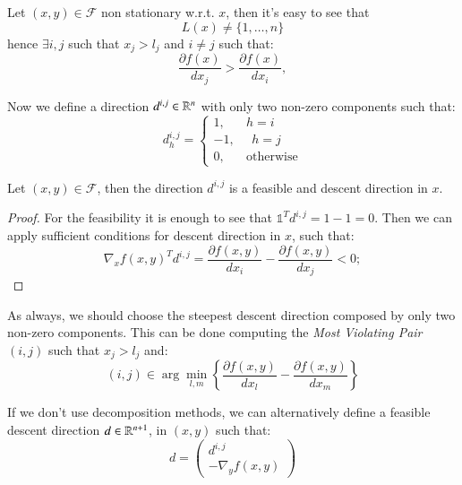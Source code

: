 Let $(x,y) \in \mathcal{F}$ non stationary w.r.t. $x$, then it's easy to see that
\begin{equation}
 L(x)\ne \{1,\ldots,n\}
\end{equation}
hence $\exists i,j$ such that $x_j>l_j$ and $i \ne j$ such that:
\begin{equation}
 \frac{\partial f(x)}{dx_j} > \frac{\partial f(x)}{dx_i}, 
\end{equation}

Now we define a direction $d^{i,j} \in \mathbb{R}^n$ with only two non-zero components such that:
\begin{equation}\label{eq:direction}
d_h^{i,j}= 
\begin{cases}
1, \quad \text{    } h=i\\
-1, \text{    } \text{    } h=j\\
0, \quad \text{    } \text{otherwise}
\end{cases}
\end{equation}

\begin{proposition}
Let $(x,y) \in \mathcal{F}$, then the direction $d^{i,j}$ is a feasible and descent direction in $x$.
\end{proposition}
\begin{proof}
For the feasibility it is enough to see that $\mathds{1}^Td^{i,j}=1-1=0$.
Then we can apply sufficient conditions for descent direction in $x$, such that:
\begin{equation*}
 \nabla_xf(x,y)^Td^{i,j} =  \frac{\partial f(x,y)}{dx_i} - \frac{\partial f(x,y)}{dx_j}<0; 
\end{equation*}
\end{proof}

As always, we should choose the steepest descent direction composed by only two non-zero components.
This can be done computing the \emph{Most Violating Pair} $(i,j)$ such that $x_j>l_j$ and:
\begin{equation}
 (i,j) \in \arg \min_{l,m} \left\{\frac{\partial f(x,y)}{dx_l} - \frac{\partial f(x,y)}{dx_m}  \right\}
\end{equation}

If we don't use decomposition methods, we can alternatively define a feasible descent direction $d \in \mathbb{R}^{n+1}$, in $(x,y)$ such that:
\begin{equation}
 d=\left(\begin{matrix}d^{i,j}\\
 -\nabla_yf(x,y)
   \end{matrix}\right)
\end{equation}
\iffalse
